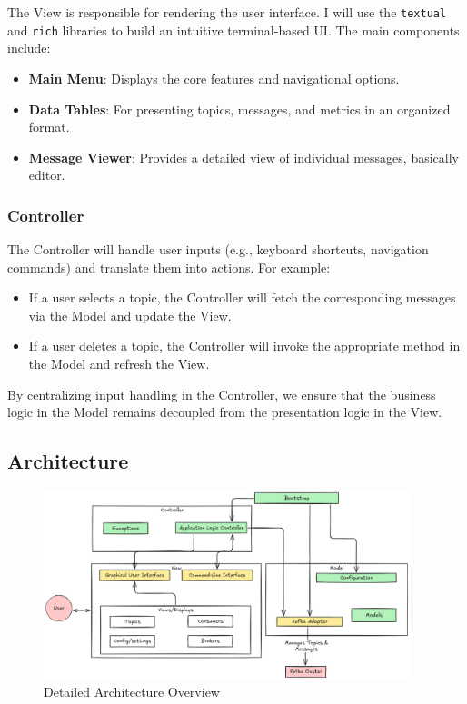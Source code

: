 \documentclass[10pt , a4paper]{report}
\begin{document}
The View is responsible for rendering the user interface. I will use the \texttt{textual} and \texttt{rich} libraries to build an intuitive terminal-based UI. The main components include:
\begin{itemize}
    \item \textbf{Main Menu}: Displays the core features and navigational options.
    \item \textbf{Data Tables}: For presenting topics, messages, and metrics in an organized format.
    \item \textbf{Message Viewer}: Provides a detailed view of individual messages, basically editor.
\end{itemize}

\subsubsection{Controller}

The Controller will handle user inputs (e.g., keyboard shortcuts, navigation commands) and translate them into actions. For example:
\begin{itemize}
    \item If a user selects a topic, the Controller will fetch the corresponding messages via the Model and update the View.
    \item If a user deletes a topic, the Controller will invoke the appropriate method in the Model and refresh the View.
\end{itemize}

By centralizing input handling in the Controller, we ensure that the business logic in the Model remains decoupled from the presentation logic in the View.

\subsection{Architecture}

\begin{figure}[htpb]
  \begin{center}
    \includegraphics[width=0.95\textwidth]{imgs/ArchitectureDetailed.png}
  \end{center}
  \caption{Detailed Architecture Overview}\label{fig:detailed_arch}
\end{figure}
\end{document}
